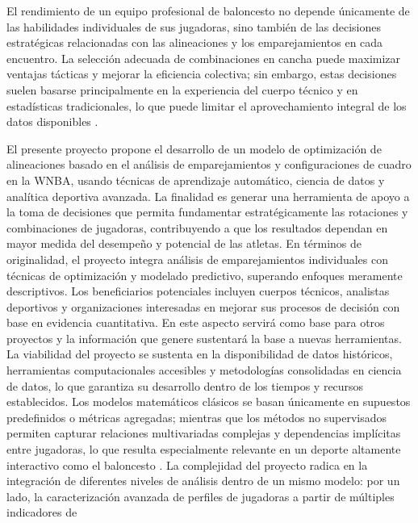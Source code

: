 El rendimiento de un equipo profesional de baloncesto no depende únicamente de las habilidades individuales
de sus jugadoras, sino también de las decisiones estratégicas relacionadas con las alineaciones y los
emparejamientos en cada encuentro. La selección adecuada de combinaciones en cancha puede maximizar
ventajas tácticas y mejorar la eficiencia colectiva; sin embargo, estas decisiones suelen basarse principalmente
en la experiencia del cuerpo técnico y en estadísticas tradicionales, lo que puede limitar el aprovechamiento
integral de los datos disponibles \cite{berri2006wages}.

El presente proyecto propone el desarrollo de un modelo de optimización de alineaciones basado en el análisis
de emparejamientos y configuraciones de cuadro en la WNBA, usando técnicas de aprendizaje automático,
ciencia de datos y analítica deportiva avanzada. La finalidad es generar una herramienta de apoyo a la toma de
decisiones que permita fundamentar estratégicamente las rotaciones y combinaciones de jugadoras,
contribuyendo a que los resultados dependan en mayor medida del desempeño y potencial de las atletas.
En términos de originalidad, el proyecto integra análisis de emparejamientos individuales con técnicas de
optimización y modelado predictivo, superando enfoques meramente descriptivos. Los beneficiarios
potenciales incluyen cuerpos técnicos, analistas deportivos y organizaciones interesadas en mejorar sus
procesos de decisión con base en evidencia cuantitativa. En este aspecto servirá como base para otros proyectos
y la información que genere sustentará la base a nuevas herramientas.
La viabilidad del proyecto se sustenta en la disponibilidad de datos históricos, herramientas computacionales
accesibles y metodologías consolidadas en ciencia de datos, lo que garantiza su desarrollo dentro de los tiempos
y recursos establecidos.
Los modelos matemáticos clásicos se basan únicamente en supuestos predefinidos o métricas agregadas;
mientras que los métodos no supervisados permiten capturar relaciones multivariadas complejas y dependencias
implícitas entre jugadoras, lo que resulta especialmente relevante en un deporte altamente interactivo como el
baloncesto \cite{yamada2024offensivelineupanalysisbasketball}.
La complejidad del proyecto radica en la integración de diferentes niveles de análisis dentro de un mismo
modelo: por un lado, la caracterización avanzada de perfiles de jugadoras a partir de múltiples indicadores de
